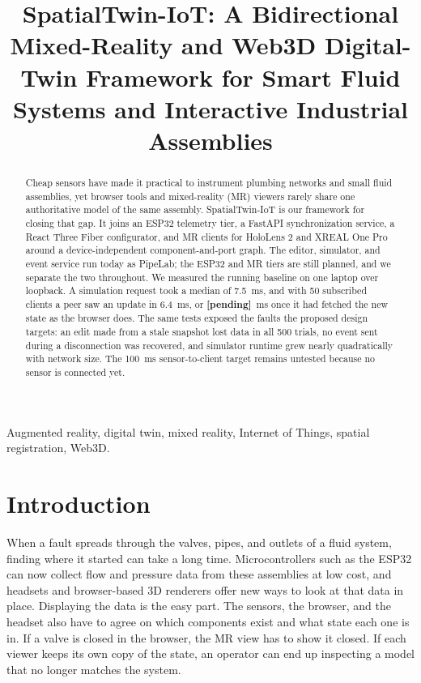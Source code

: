 \documentclass[conference]{IEEEtran}
\title{SpatialTwin-IoT: A Bidirectional Mixed-Reality and Web3D Digital-Twin Framework for Smart Fluid Systems and Interactive Industrial Assemblies}
\author{\IEEEauthorblockN{Gopal Krishna J S, M Aaryamann Prabhu, Dr. Andhe Dharani}
\IEEEauthorblockA{Department of Master of Computer Applications\\
RV College of Engineering\textsuperscript{\textregistered}, Bengaluru, India}}
\newcommand{\rttPfifty}{7.5}
\newcommand{\fanEventPfiftyF}{6.4}
\newcommand{\lostTrials}{500}
\newcommand{\fanGetPfiftyF}{\textbf{[pending]}}
\begin{document}
\maketitle

\begin{abstract}
Cheap sensors have made it practical to instrument plumbing networks and small fluid assemblies, yet browser tools and mixed-reality (MR) viewers rarely share one authoritative model of the same assembly. SpatialTwin-IoT is our framework for closing that gap. It joins an ESP32 telemetry tier, a FastAPI synchronization service, a React Three Fiber configurator, and MR clients for HoloLens 2 and XREAL One Pro around a device-independent component-and-port graph. The editor, simulator, and event service run today as PipeLab; the ESP32 and MR tiers are still planned, and we separate the two throughout. We measured the running baseline on one laptop over loopback. A simulation request took a median of \rttPfifty~ms, and with 50 subscribed clients a peer saw an update in \fanEventPfiftyF~ms, or \fanGetPfiftyF~ms once it had fetched the new state as the browser does. The same tests exposed the faults the proposed design targets: an edit made from a stale snapshot lost data in all \lostTrials{} trials, no event sent during a disconnection was recovered, and simulator runtime grew nearly quadratically with network size. The 100~ms sensor-to-client target remains untested because no sensor is connected yet.
\end{abstract}

\begin{IEEEkeywords}
Augmented reality, digital twin, mixed reality, Internet of Things, spatial registration, Web3D.
\end{IEEEkeywords}

\section{Introduction}
When a fault spreads through the valves, pipes, and outlets of a fluid system, finding where it started can take a long time. Microcontrollers such as the ESP32 can now collect flow and pressure data from these assemblies at low cost, and headsets and browser-based 3D renderers offer new ways to look at that data in place. Displaying the data is the easy part. The sensors, the browser, and the headset also have to agree on which components exist and what state each one is in. If a valve is closed in the browser, the MR view has to show it closed. If each viewer keeps its own copy of the state, an operator can end up inspecting a model that no longer matches the system.
\end{document}
